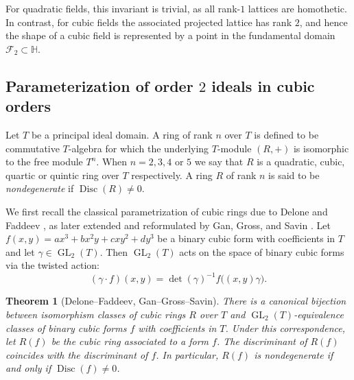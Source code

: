 \documentclass[table]{amsart}
\newtheorem{theorem}{Theorem}[section]
\newcommand{\op}[1]{\operatorname{#1}}
\numberwithin{equation}{section}
\begin{document}
For quadratic fields, this invariant is trivial, as all rank-$1$ lattices are homothetic. In contrast, for cubic fields the associated projected lattice has rank $2$, and hence the shape of a cubic field is represented by a point in the fundamental domain $\mathcal{F}_2 \subset \mathbb{H}$.
\subsection{Parameterization of order $2$ ideals in cubic orders}

Let $T$ be a principal ideal domain. A ring of rank $n$ over $T$ is defined to be commutative $T$-algebra for which the underlying $T$-module $(R,+)$ is isomorphic to the free module $T^n$. When $n=2,3,4$ or $5$ we say that $R$ is a quadratic, cubic, quartic or quintic ring over $T$ respectively. A ring $R$ of rank $n$ is said to be \emph{nondegenerate} if $\op{Disc}(R)\neq 0$. 

\par We first recall the classical parametrization of cubic rings due to Delone and Faddeev \cite{DeloneFaddev}, as later extended and reformulated by Gan, Gross, and Savin \cite[Proposition 4.2]{GGS}. Let $f(x,y)=ax^{3}+bx^{2}y+cxy^{2}+dy^{3}$ be a binary cubic form with coefficients in $T$ and let $\gamma\in \op{GL}_2(T)$. Then \(\op{GL}_{2}(T)\) acts on the space of binary cubic forms via the twisted action:
\[
(\gamma\cdot f)(x,y)=\det(\gamma)^{-1} f\big((x,y)\gamma\big).
\]

\begin{theorem}[Delone--Faddeev, Gan--Gross--Savin]
There is a canonical bijection between isomorphism classes of cubic rings $R$ over $T$ and
$\op{GL}_{2}(T)$-equivalence classes of binary cubic forms $f$ with coefficients in $T$.
Under this correspondence, let $R(f)$ be the cubic ring associated to a form $f$. The discriminant of $R(f)$ coincides with the
discriminant of $f$. In particular, \(R(f)\) is nondegenerate if and only if \(\op{Disc}(f)\neq 0\).
\end{theorem}
\end{document}
